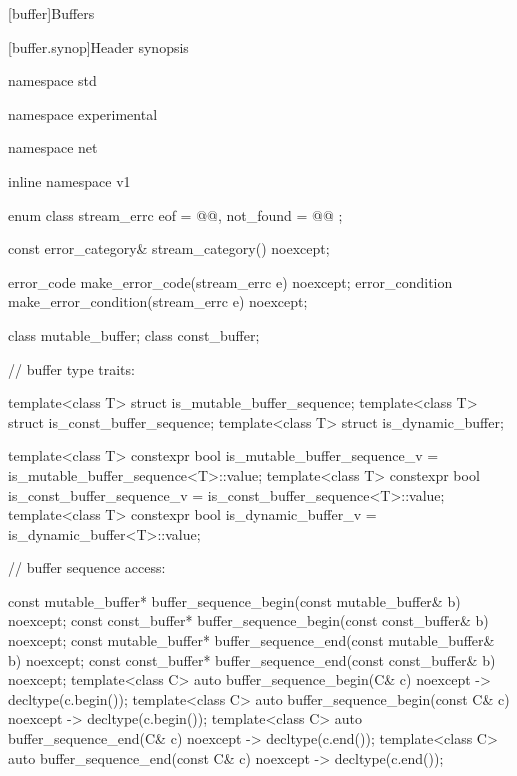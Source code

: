 
[buffer]{Buffers}


%
[buffer.synop]{Header  synopsis}

%
%
%
%
\begin{codeblock}
namespace std {
namespace experimental {
namespace net {
inline namespace v1 {

  enum class stream_errc {
    eof = @@,
    not_found = @@
  };

  const error_category& stream_category() noexcept;

  error_code make_error_code(stream_errc e) noexcept;
  error_condition make_error_condition(stream_errc e) noexcept;

  class mutable_buffer;
  class const_buffer;

  // buffer type traits:

  template<class T> struct is_mutable_buffer_sequence;
  template<class T> struct is_const_buffer_sequence;
  template<class T> struct is_dynamic_buffer;

  template<class T>
      constexpr bool is_mutable_buffer_sequence_v = is_mutable_buffer_sequence<T>::value;
    template<class T>
      constexpr bool is_const_buffer_sequence_v = is_const_buffer_sequence<T>::value;
    template<class T>
      constexpr bool is_dynamic_buffer_v = is_dynamic_buffer<T>::value;

  // buffer sequence access:

  const mutable_buffer* buffer_sequence_begin(const mutable_buffer& b) noexcept;
  const const_buffer* buffer_sequence_begin(const const_buffer& b) noexcept;
  const mutable_buffer* buffer_sequence_end(const mutable_buffer& b) noexcept;
  const const_buffer* buffer_sequence_end(const const_buffer& b) noexcept;
  template<class C> auto buffer_sequence_begin(C& c) noexcept -> decltype(c.begin());
  template<class C> auto buffer_sequence_begin(const C& c) noexcept -> decltype(c.begin());
  template<class C> auto buffer_sequence_end(C& c) noexcept -> decltype(c.end());
  template<class C> auto buffer_sequence_end(const C& c) noexcept -> decltype(c.end());

}}}}
\end{codeblock}
